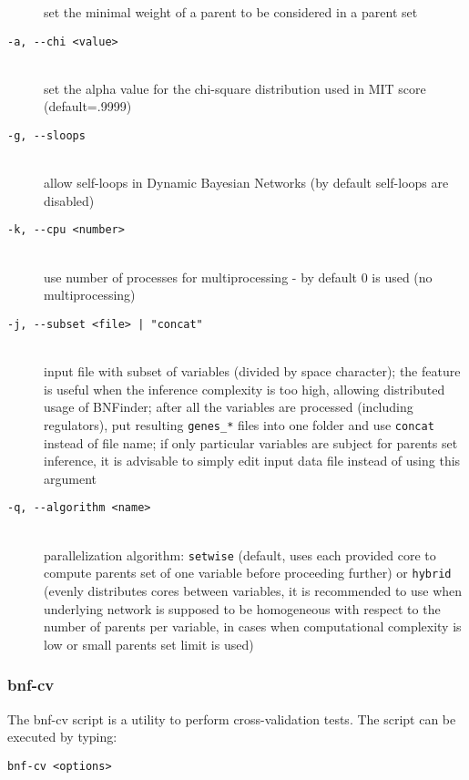 \begin{description}
 set the minimal weight of a parent to be considered in a parent set %
\item[\texttt{-a, -\hspace{0pt}-chi <value>}]~\\
 set the alpha value for the chi-square distribution used in MIT score (default=.9999)
\item[\texttt{-g, -\hspace{0pt}-sloops}]~\\
 allow self-loops in Dynamic Bayesian Networks (by default self-loops are disabled)
\item[\texttt{-k, -\hspace{0pt}-cpu <number>}]~\\
 use number of processes for multiprocessing - by default 0 is used (no multiprocessing)
\item[\texttt{-j, -\hspace{0pt}-subset <file> | "concat"}]~\\
 input file with subset of variables (divided by space character); the feature is useful when the inference complexity is too high, allowing distributed usage of BNFinder; after all the variables are processed (including regulators), put resulting \texttt{genes_*} files into one folder and use \texttt{concat} instead of file name; if only particular variables are subject for parents set inference, it is advisable to simply edit input data file instead of using this argument
\item[\texttt{-q, -\hspace{0pt}-algorithm <name>}]~\\
 parallelization algorithm: \texttt{setwise} (default, uses each provided core to compute parents set of one variable before proceeding further) or \texttt{hybrid} (evenly distributes cores between variables, it is recommended to use when underlying network is supposed to be homogeneous with respect to the number of parents per variable, in cases when computational complexity is low or small parents set limit is used) 
 
\end{description}

\subsubsection{bnf-cv}

The bnf-cv script is a utility to perform cross-validation tests. The script can be executed by typing:
\begin{verbatim}
bnf-cv <options>
\end{verbatim}

